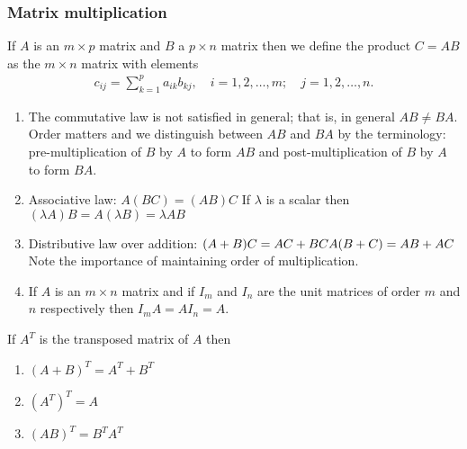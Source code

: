\documentclass[12pt,a4paper,fleqn]{mycalc}
\begin{document}
	\subsubsection{Matrix multiplication}
	If $ A $ is an $ m \times p $ matrix and $ B $ a $ p \times n $ matrix then we define the product $ C = AB $ as the
	$ m \times n $ matrix with elements
	\begin{align*}
	c_{ij}=\sum_{k=1}^{p}a_{ik}b_{kj},\quad i=1,2,\dots,m;\quad j=1,2,\dots,n.
	\end{align*}
	\begin{tcolorbox}[title={Properties of multiplication}]
		\begin{enumerate}[i]
			\item The commutative law is not satisfied in general; that is, in general $ AB \neq BA. $ Order matters and we distinguish between $ AB $ and $ BA $ by the terminology: pre-multiplication of $ B $ by $ A $ to form $ AB $ and post-multiplication of $ B $ by $ A $ to form $ BA. $
			\item Associative law: $ A(BC) = (AB)C $
			If $ \lambda  $ is a scalar then $ (\lambda A)B = A(\lambda B) = \lambda AB $
			\item Distributive law over addition:
			$ (A + B)C = AC + BC\\
			A(B + C) = AB + AC $\\
			Note the importance of maintaining order of multiplication.
			\item If $ A $ is an $ m \times n $ matrix and if $ I_m $ and $ I_n $ are the unit matrices of order $ m $ and $ n $ respectively then $ I_mA=AI_n=A. $
		\end{enumerate}
	\end{tcolorbox}
	\begin{tcolorbox}[title={Properties of the Transpose}]
		If $ A^{T} $ is the transposed matrix of $ A $ then
		\begin{enumerate}[i]
			\item $ (A + B)^{T} = A^{T} + B^{T} $
			\item $ (A^{T})^{T} = A $
			\item $ (AB)^{T} = B^{T}A^{T} $
		\end{enumerate}
	\end{tcolorbox}
\end{document}
